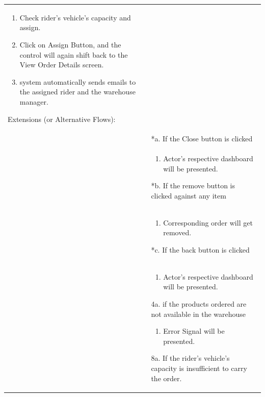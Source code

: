 \documentclass[12pt,a4paper]{article}
\begin{document}
\begin{longtable}{| p{3cm}|p{12cm}|}
\begin{enumerate}
\item Check rider's vehicle's capacity and assign.

\item Click on Assign Button, and the control will again shift back to the View Order Details screen.

\item system automatically sends emails to the assigned rider and the warehouse manager.

\end{enumerate}



Extensions (or Alternative Flows):\\

& *a. If the Close button is clicked \\

& \begin{enumerate}

		\item Actor's respective dashboard will be presented.

	\end{enumerate}

*b. If the remove button is clicked against any item\\

& \begin{enumerate}

		\item Corresponding order will get removed.

	\end{enumerate}

*c. If the back button is clicked\\

& \begin{enumerate}

		\item Actor's respective dashboard will be presented.

	\end{enumerate}

4a. if the products ordered are not available in the warehouse

 	\begin{enumerate}

		\item Error Signal will be presented.

	\end{enumerate}

8a. If the rider's vehicle's capacity is insufficient to carry the order.


\end{longtable}
\end{document}
